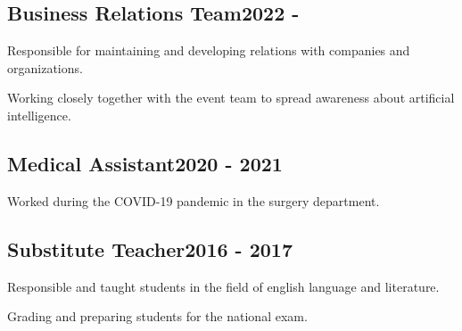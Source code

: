 \documentclass[a4paper,12pt]{article}
\begin{document}


\vspace*{10pt}
\subsection{{Business Relations Team}\hfill 2022 - }
\begin{zitemize}
\item Responsible for maintaining and developing relations with companies and organizations.
\item Working closely together with the event team to spread awareness about artificial intelligence.
\end{zitemize}

\vspace*{6pt}
\subsection{{Medical Assistant}\hfill 2020 - 2021}
\begin{zitemize}
\item Worked during the COVID-19 pandemic in the surgery department.
\end{zitemize}

\vspace*{6pt}
\subsection{{Substitute Teacher}\hfill 2016 - 2017}
\begin{zitemize}
\item Responsible and taught students in the field of english language and literature.
\item Grading and preparing students for the national exam.
\end{zitemize}
\end{document}

